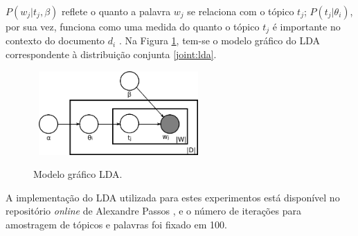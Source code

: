 \ensuremath{P(w_j|t_j,\beta)} reflete o quanto a palavra \ensuremath{w_j} se relaciona com o tópico \ensuremath{t_j}; \ensuremath{P(t_j|\theta_i)}, por sua vez, funciona como uma medida do quanto o tópico \ensuremath{t_j} é importante no contexto do documento \ensuremath{d_i} \cite{pnas}. Na Figura \ref{fig:lda}, tem-se o modelo gráfico do LDA correspondente à distribuição conjunta \ref{joint:lda}. 

\begin{figure}[t]
  \centering %
  \includegraphics[width=6.5cm, height=3.2cm]{Latent_Dirichlet_allocation.png}\\
  \caption{Modelo gráfico LDA.} %
  \label{fig:lda}
\end{figure}

A implementação do LDA utilizada para estes experimentos está disponível no repositório \emph{online} de Alexandre Passos \cite{top-lda}, e o número de iterações para amostragem de tópicos e palavras foi fixado em 100. 






